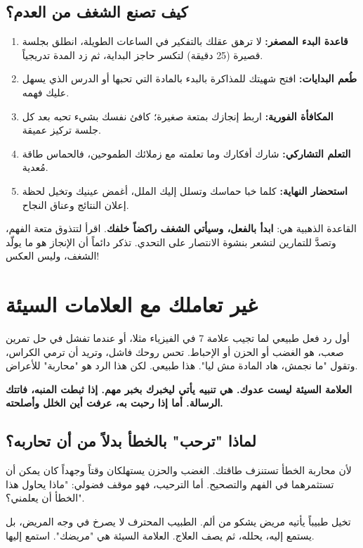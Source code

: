 \documentclass[12pt,a4paper]{book}
\newcommand{\importantAr}[1]{%
	\begin{important}
		\bfseries #1
	\end{important}
}
\begin{document}
	\subsection*{كيف تصنع الشغف من العدم؟}
	\begin{enumerate}
		\item \textbf{قاعدة البدء المصغر:} لا ترهق عقلك بالتفكير في الساعات الطويلة، انطلق بجلسة قصيرة (25 دقيقة) لتكسر حاجز البداية، ثم زد المدة تدريجياً.
		\item \textbf{طُعم البدايات:} افتح شهيتك للمذاكرة بالبدء بالمادة التي تحبها أو الدرس الذي يسهل عليك فهمه.
		\item \textbf{المكافأة الفورية:} اربط إنجازك بمتعة صغيرة؛ كافئ نفسك بشيء تحبه بعد كل جلسة تركيز عميقة.
		\item \textbf{التعلم التشاركي:} شارك أفكارك وما تعلمته مع زملائك الطموحين، فالحماس طاقة مُعدية.
		\item \textbf{استحضار النهاية:} كلما خبا حماسك وتسلل إليك الملل، أغمض عينيك وتخيل لحظة إعلان النتائج وعناق النجاح.
	\end{enumerate}
	
	القاعدة الذهبية هي: \textbf{ابدأ بالفعل، وسيأتي الشغف راكضاً خلفك}. اقرأ لتتذوق متعة الفهم، وتصدَّ للتمارين لتشعر بنشوة الانتصار على التحدي. تذكر دائماً أن الإنجاز هو ما يولّد الشغف، وليس العكس!
	
	
	\section{غير تعاملك مع العلامات السيئة}
	\label{sec:welcome-symptoms}
	
	أول رد فعل طبيعي لما تجيب علامة 7 في الفيزياء مثلا، أو عندما تفشل في حل تمرين صعب، هو الغضب أو الحزن أو الإحباط. تحس روحك فاشل، وتريد أن ترمي الكراس، وتقول "ما نجمش، هاد المادة مش ليا". هذا طبيعي. لكن هذا الرد هو "محاربة" للأعراض.
	
	\importantAr{العلامة السيئة ليست عدوك. هي تنبيه يأتي ليخبرك بخبر مهم. إذا ثبطت المنبه، فاتتك الرسالة. أما إذا رحبت به، عرفت أين الخلل وأصلحته.}
	
	\subsection{لماذا "ترحب" بالخطأ بدلاً من أن تحاربه؟}
	
	لأن محاربة الخطأ تستنزف طاقتك. الغضب والحزن يستهلكان وقتاً وجهداً كان يمكن أن تستثمرهما في الفهم والتصحيح. أما الترحيب، فهو موقف فضولي: "ماذا يحاول هذا الخطأ أن يعلمني؟".
	
	تخيل طبيباً يأتيه مريض يشكو من ألم. الطبيب المحترف لا يصرخ في وجه المريض، بل يستمع إليه، يحلله، ثم يصف العلاج. العلامة السيئة هي "مريضك". استمع إليها.
	
\end{document}
